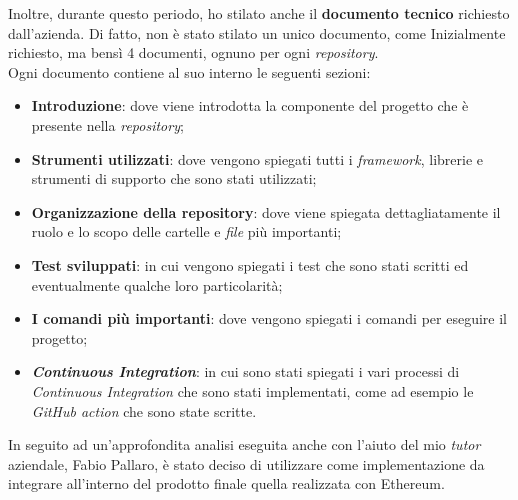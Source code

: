 Inoltre, durante questo periodo, ho stilato anche il \textbf{documento tecnico} richiesto dall'azienda. Di fatto, non è stato stilato un unico documento, come Inizialmente richiesto, ma bensì 4 documenti, ognuno per ogni \textit{repository}. \\

\noindent Ogni documento contiene al suo interno le seguenti sezioni:
\begin{itemize}
  \item \textbf{Introduzione}: dove viene introdotta la componente del progetto che è presente nella \textit{repository};
  \item \textbf{Strumenti utilizzati}: dove vengono spiegati tutti i \textit{framework}, librerie e strumenti di supporto che sono stati utilizzati;
  \item \textbf{Organizzazione della repository}: dove viene spiegata dettagliatamente il ruolo e lo scopo delle cartelle e \textit{file} più importanti;
  \item \textbf{Test sviluppati}: in cui vengono spiegati i test che sono stati scritti ed eventualmente qualche loro particolarità;
  \item \textbf{I comandi più importanti}: dove vengono spiegati i comandi per eseguire il progetto;
  \item \textbf{\textit{Continuous Integration}}: in cui sono stati spiegati i vari processi di \textit{Continuous Integration} che sono stati implementati, come ad esempio le \textit{GitHub action} che sono state scritte.
\end{itemize}

In seguito ad un'approfondita analisi eseguita anche con l'aiuto del mio \textit{tutor} aziendale, Fabio Pallaro, è stato deciso di utilizzare come implementazione da integrare all'interno del prodotto finale quella realizzata con Ethereum.
